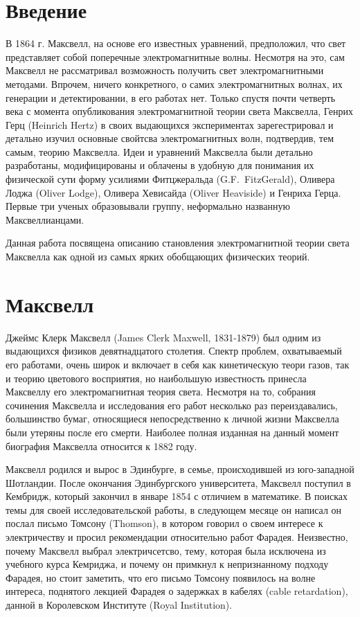 \documentclass[12pt, oneside, a4paper]{article}
\begin{document}
\section*{Введение}
В 1864 г. Максвелл, на основе его известных уравнений, предположил, что свет представляет собой поперечные электромагнитные волны. Несмотря на это, сам Максвелл не рассматривал возможность получить свет электромагнитными методами. Впрочем, ничего конкретного, о самих электромагнитных волнах, их генерации и детектировании, в его работах нет. Только спустя почти четверть века с момента опубликования электромагнитной теории света Максвелла, Генрих Герц (Heinrich Hertz) в своих выдающихся  экспериментах зарегестрировал и детально изучил основные свойтсва электромагнитных волн, подтвердив, тем самым, теорию Максвелла. Идеи и уравнений  Максвелла были детально разработаны, модифицированы и облачены в удобную для понимания их физической сути форму усилиями Фитцжеральда (G.F.~FitzGerald), Оливера Лоджа (Oliver Lodge), Оливера Хевисайда (Oliver Heaviside) и Генриха Герца. Первые три ученых образовывали группу, неформально названную Максвеллианцами. 

Данная работа посвящена описанию становления электромагнитной теории света Максвелла как одной из самых ярких обобщающих физических теорий.

\section*{Максвелл}
Джеймс Клерк Максвелл (James Clerk Maxwell, 1831-1879) был одним из выдающихся физиков девятнадцатого столетия. Спектр проблем, охватываемый его работами, очень широк и включает в себя как кинетическую теори газов, так и теорию цветового восприятия, но наибольшую известность принесла Максвеллу его электромагнитная теория света. Несмотря на то, собрания сочинения Максвелла и исследования его работ несколько раз переиздавались, большинство бумаг, относящиеся непосредственно к личной жизни Максвелла были утеряны после его смерти. Наиболее полная изданная на данный момент биография Максвелла относится к 1882 году.

Максвелл родился и вырос в Эдинбурге, в семье, происходившей из юго-западной Шотландии. После окончания Эдинбургского университета, Максвелл поступил в Кембридж, который закончил в январе 1854 с отличием в математике. В поисках темы для своей исследовательской работы, в следующем месяце он написал он послал письмо Томсону (Thomson), в котором говорил о своем интересе к электричеству и просил рекомендации относительно работ Фарадея. Неизвестно, почему Максвелл выбрал электричсетсво, тему, которая была исключена из учебного курса Кемриджа, и почему он примкнул к непризнанному подходу Фарадея, но стоит заметить, что  его письмо Томсону появилось на волне интереса, поднятого лекцией Фарадея о задержках в кабелях (cable retardation), данной в Королевском Институте (Royal Institution). 
\end{document}
